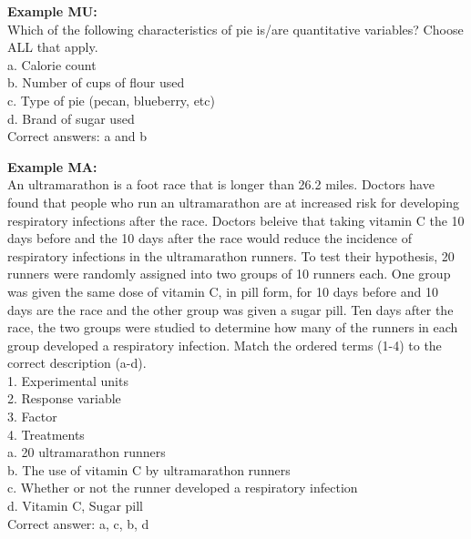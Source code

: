 \documentclass{article}\usepackage[]{graphicx}\usepackage[]{color}
\numberwithin{equation}{section} %
\begin{document}
\begin{framed}
\textbf{Example MU:}\\

Which of the following characteristics of pie is/are quantitative variables? Choose ALL that apply.\\

a. Calorie count\\
b. Number of cups of flour used\\
c. Type of pie (pecan, blueberry, etc)\\
d. Brand of sugar used\\

Correct answers: a and b
\end{framed}

\begin{framed}
\textbf{Example MA:}\\

An ultramarathon is a foot race that is longer than 26.2 miles. Doctors have found that people who run an ultramarathon are at increased risk for developing respiratory infections after the race. Doctors beleive that taking vitamin C the 10 days before and the 10 days after the race would reduce the incidence of respiratory infections in the ultramarathon runners. To test their hypothesis, 20 runners were randomly assigned into two groups of 10 runners each. One group was given the same dose of vitamin C, in pill form, for 10 days before and 10 days are the race and the other group was given a sugar pill. Ten days after the race, the two groups were studied to determine how many of the runners in each group developed a respiratory infection. Match the ordered terms (1-4) to the correct description (a-d).\\

1. Experimental units\\
2. Response variable\\
3. Factor\\
4. Treatments\\

a. 20 ultramarathon runners\\
b. The use of vitamin C by ultramarathon runners\\
c. Whether or not the runner developed a respiratory infection\\
d. Vitamin C, Sugar pill\\

Correct answer: a, c, b, d
\end{framed}
\end{document}
